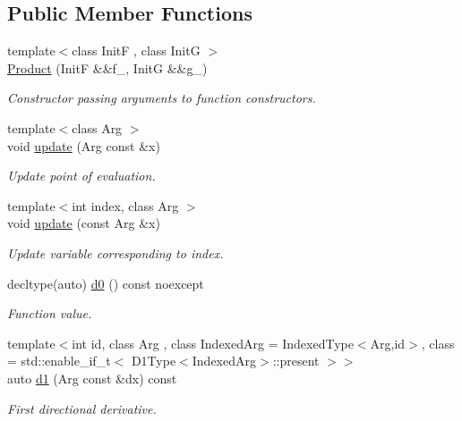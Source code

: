 \subsection*{Public Member Functions}
\begin{DoxyCompactItemize}
\item 
{\footnotesize template$<$class Init\-F , class Init\-G $>$ }\\\hyperlink{structFunG_1_1MathematicalOperations_1_1Product_ade95a856ff3ff32f6e6aea2177478589}{Product} (Init\-F \&\&f\-\_\-, Init\-G \&\&g\-\_\-)
\begin{DoxyCompactList}\small\item\em Constructor passing arguments to function constructors. \end{DoxyCompactList}\item 
{\footnotesize template$<$class Arg $>$ }\\void \hyperlink{structFunG_1_1MathematicalOperations_1_1Product_a5b45c1bac06651ee5b6ea79fb5128ef9}{update} (Arg const \&x)
\begin{DoxyCompactList}\small\item\em Update point of evaluation. \end{DoxyCompactList}\item 
{\footnotesize template$<$int index, class Arg $>$ }\\void \hyperlink{structFunG_1_1MathematicalOperations_1_1Product_a8db3d935bbe273c0436ff3bc6bb6b786}{update} (const Arg \&x)
\begin{DoxyCompactList}\small\item\em Update variable corresponding to index. \end{DoxyCompactList}\item 
decltype(auto) \hyperlink{structFunG_1_1MathematicalOperations_1_1Product_a2dcd0cd8b29911b24ee830b8aaa6441c}{d0} () const noexcept
\begin{DoxyCompactList}\small\item\em Function value. \end{DoxyCompactList}\item 
{\footnotesize template$<$int id, class Arg , class Indexed\-Arg  = Indexed\-Type$<$\-Arg,id$>$, class  = std\-::enable\-\_\-if\-\_\-t$<$ D1\-Type$<$\-Indexed\-Arg$>$\-::present $>$$>$ }\\auto \hyperlink{structFunG_1_1MathematicalOperations_1_1Product_aea69feaac16f79717a85d7b089a80f8f}{d1} (Arg const \&dx) const 
\begin{DoxyCompactList}\small\item\em First directional derivative. \end{DoxyCompactList}\item 

\end{DoxyCompactItemize}
